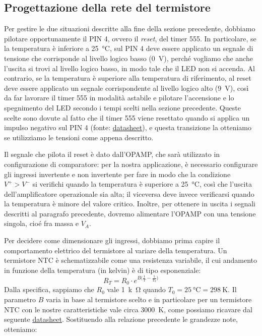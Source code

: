\documentclass{report}
\begin{document}
\subsection{Progettazione della rete del termistore}\label{rete_termistore}
Per gestire le due situazioni descritte alla fine della sezione precedente, dobbiamo pilotare opportunamente il PIN 4, ovvero il \textit{reset}, del timer 555. In particolare, se la temperatura è inferiore a \SI{25}{\celsius}, sul PIN 4 deve essere applicato un segnale di tensione che corrisponde al livello logico basso (\SI{0}{\volt}), perché vogliamo che anche l'uscita si trovi al livello logico basso,  in modo tale che il LED non si accenda. Al contrario, se la temperatura è superiore alla temperatura di riferimento, al reset deve essere applicato un segnale corrispondente al livello logico alto (\SI{9}{\volt}), così da far lavorare il timer 555 in modalità astabile e pilotare l'accensione e lo spegnimento del LED secondo i tempi scelti nella sezione precedente. Queste scelte sono dovute al fatto che il timer 555 viene resettato quando si applica un impulso negativo sul PIN 4 (fonte: \textcolor{blue}{\underline{\href{https://www.ti.com/lit/ds/symlink/lm555.pdf?ts=1667144089940&ref_url=https\%253A\%252F\%252Fwww.ti.com\%252Fproduct\%252FLM555}{datasheet}}}), e questa transizione la otteniamo se utilizziamo le tensioni come appena descritto. \par
Il segnale che pilota il reset è dato dall'OPAMP, che sarà utilizzato in configurazione di comparatore: per la nostra applicazione, è necessario configurare gli ingressi invertente e non invertente per fare in modo che la condizione $V^+>V^-$ si verifichi quando la temperatura è superiore a \SI{25}{\celsius}, così che l'uscita dell'amplificatore operazionale sia alta; il viceversa deve invece verificarsi quando la temperatura è minore del valore critico. Inoltre, per ottenere in uscita i segnali descritti al paragrafo precedente, dovremo alimentare l'OPAMP con una tensione singola, cioé fra massa e $V_A$. \par
Per decidere come dimensionare gli ingressi, dobbiamo prima capire il comportamento elettrico del termistore al variare della temperatura. Un termistore NTC è schematizzabile come una resistenza variabile, il cui andamento in funzione della temperatura (in kelvin) è di tipo esponenziale:
$$ R_T = R_0\cdot e^{B\bigl(\frac{1}{T}-\frac{1}{T_0}\bigr)}$$
Dalla specifica, sappiamo che $R_0$ vale \SI{1}{k\ohm} quando $T_0 = \SI{25}{\celsius}=\SI{298}{\kelvin}$. Il parametro $B$ varia in base al termistore scelto e in particolare per un termistore NTC con le nostre caratteristiche vale circa \SI{3000}{\kelvin}, come possiamo ricavare dal seguente \textcolor{blue}{\underline{\href{https://www.mouser.it/datasheet/2/240/Littelfuse_Leaded_Thermistors_Glass_Encapsulated_T-1315924.pdf}{datasheet}}}. Sostituendo alla relazione precedente le grandezze note, otteniamo:
\end{document}
